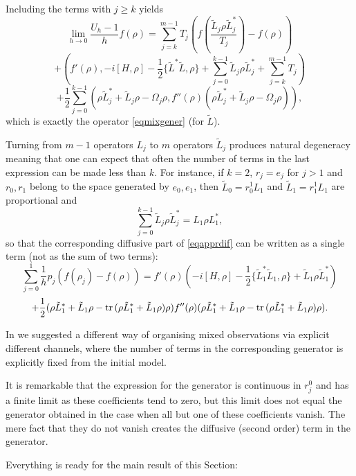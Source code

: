 \documentclass[12pt]{article}
\def\tr{\rm{tr}}
\newcommand{\Om}{\Omega}
\begin{document}
Including the terms with $j\ge k$ yields
\[
\lim_{h\to 0} \frac{U_h-1}{h} f(\rho)=\sum_{j=k}^{m-1} T_j \left(f(\frac{\tilde L_j \rho \tilde L_j^*}{T_j})-f(\rho)\right)
\]
\[
+\left(f'(\rho), -i[H, \rho] -\frac12 \{\tilde L^*\tilde L,\rho\}
+\sum_{j=0}^{k-1}\tilde L_j \rho \tilde L_j^*
+\sum_{j=k}^{m-1} T_j\right)
\]
\begin{equation}
\label{eqapprdif}
+\frac12 \sum_{j=0}^{k-1}  \left(\rho \tilde L_j^* + \tilde L_j\rho-\Om_j \rho,
f''(\rho)  (\rho \tilde L_j^* + \tilde L_j\rho-\Om_j \rho)\right),
\end{equation}
which is exactly the operator \eqref{eqmixgener} (for $\tilde L$).

Turning from $m-1$ operators $L_j$
to $m$ operators $\tilde L_j$ produces natural degeneracy meaning
that one can expect that often the number of terms in the last expression
can be made less than $k$. For instance, if $k=2$, $r_j=e_j$ for $j>1$ and $r_0,r_1$ belong to the
space generated by $e_0,e_1$, then $\tilde L_0=r_0^1 L_1$ and $\tilde L_1=r^1_1 L_1$
are proportional and
\[
\sum_{j=0}^{k-1} \tilde L_j \rho \tilde L_j^*=L_1\rho L_1^*,
\]
so that the corresponding diffusive part of \eqref{eqapprdif}
can be written as a single term (not as the sum of two terms):
\[
\sum_{j=0}^1 \frac{1}{h} p_j (f(\rho_j)-f(\rho))
=f'(\rho) \left(-i[H, \rho] -\frac12 \{\tilde L_1^*\tilde L_1,\rho\} +\tilde L_1 \rho \tilde L_1^* \right)
\]
\[
+\frac12 (\rho \tilde L_1^* + \tilde L_1\rho-{\tr} \, (\rho \tilde L_1^* +\tilde L_1 \rho) \rho) f''(\rho)
 (\rho \tilde L_1^* + \tilde L_1\rho-{\tr}\, (\rho \tilde L_1^* +\tilde L_1 \rho)  \rho).
\]

In \cite{KolQuantFrac} we suggested a different way of organising mixed observations via
explicit different channels, where the number of terms in the corresponding generator
is explicitly fixed from the initial model.

It is remarkable that the expression for the generator is continuous
in $r_j^0$ and has a finite limit as these coefficients
tend to zero, but this limit does not equal the generator
obtained in the case when all but one of these coefficients vanish.
The mere fact that they do not vanish creates the diffusive (second order) term in the generator.

Everything is ready for the main result of this Section:
\end{document}
